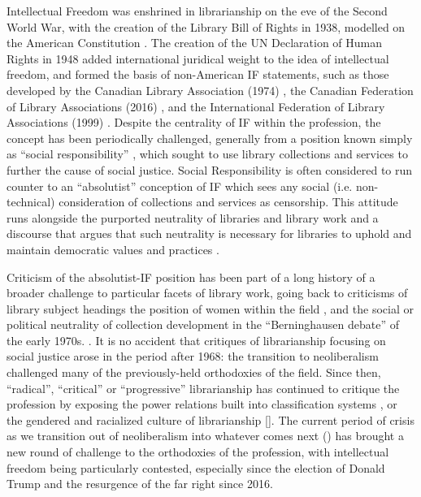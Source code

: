 \documentclass[12pt,oneside]{memoir}
\begin{document}
Intellectual Freedom was enshrined in librarianship on the eve of the Second World War, with the creation of the Library Bill of Rights in 1938, modelled on the American Constitution \cite[147-152]{samek-if1}. The creation of the UN Declaration of Human Rights in 1948 added international juridical weight to the idea of intellectual freedom, and formed the basis of non-American IF statements, such as those developed by the Canadian Library Association (1974) \cite{cla-if}, the Canadian Federation of Library Associations (2016) \cite{cfla-if}, and the International Federation of Library Associations (1999) \cite{ifla-if}. Despite the centrality of IF within the profession, the concept has been periodically challenged, generally from a position known simply as ``social responsibility'' \cite{samek-if1}, which sought to use library collections and services to further the cause of social justice. Social Responsibility is often considered to run counter to an ``absolutist'' conception of IF \cite[89]{gorman-2000} which sees any social (i.e. non-technical) consideration of collections and services as censorship. This attitude runs alongside the purported neutrality of libraries and library work \cite{lewis-2008} and a discourse that argues that such neutrality is necessary for libraries to uphold and maintain democratic values and practices \cite{popowich-2019}.

Criticism of the absolutist-IF position has been part of a long history of a broader challenge to particular facets of library work, going back to criticisms of library subject headings \cite{berman-1971} the position of women within the field \cite{garrison-1972}, and the social or political neutrality of collection development in the ``Berninghausen debate'' of the early 1970s. \cite[4-5]{samek-if1}. It is no accident that critiques of librarianship focusing on social justice arose in the period after 1968: the transition to neoliberalism challenged many of the previously-held orthodoxies of the field. Since then, ``radical'', ``critical'' or ``progressive'' librarianship has continued to critique the profession by exposing the power relations built into classification systems \cite{olson-2002}, or the gendered and racialized culture of librarianship [\cite{lew-yousefi-2017, schlesselman-tarango-2017, chou-pho-2018}]. The current period of crisis as we transition out of neoliberalism into whatever comes next (\cite{bonfert-2020}) has brought a new round of challenge to the orthodoxies of the profession, with intellectual freedom being particularly contested, especially since the election of Donald Trump and the resurgence of the far right since 2016. 
\end{document}
